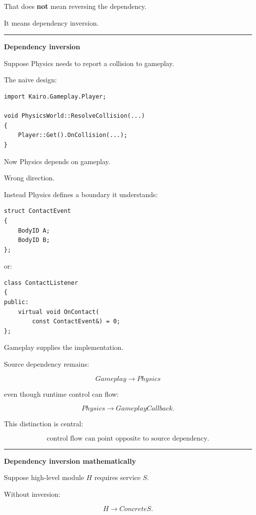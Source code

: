 That does \textbf{not} mean reversing the dependency.

It means dependency inversion.

\begin{center}\rule{0.5\linewidth}{0.5pt}\end{center}

\textbf{Dependency inversion}

Suppose Physics needs to report a collision to gameplay.

The naive design:

\begin{verbatim}
import Kairo.Gameplay.Player;

void PhysicsWorld::ResolveCollision(...)
{
    Player::Get().OnCollision(...);
}
\end{verbatim}

Now Physics depends on gameplay.

Wrong direction.

Instead Physics defines a boundary it understands:

\begin{verbatim}
struct ContactEvent
{
    BodyID A;
    BodyID B;
};
\end{verbatim}

or:

\begin{verbatim}
class ContactListener
{
public:
    virtual void OnContact(
        const ContactEvent&) = 0;
};
\end{verbatim}

Gameplay supplies the implementation.

Source dependency remains:

\[
Gameplay\rightarrow Physics
\]

even though runtime control can flow:

\[
Physics\rightarrow GameplayCallback.
\]

This distinction is central:

\[
\boxed{
\text{control flow can point opposite to source dependency}.
}
\]

\begin{center}\rule{0.5\linewidth}{0.5pt}\end{center}

\textbf{Dependency inversion mathematically}

Suppose high-level module \(H\) requires service \(S\).

Without inversion:

\[
H\rightarrow ConcreteS.
\]

